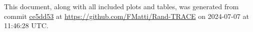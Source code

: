 This document, along with all included plots and tables, was generated from commit \href{https://github.com/FMatti/Rand-TRACE/tree/ce5dd53}{ce5dd53} at \url{https://github.com/FMatti/Rand-TRACE} on 2024-07-07 at 11:46:28 UTC.
